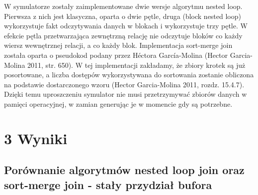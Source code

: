 \documentclass[]{article}
\begin{document}
W symulatorze zostały zaimplementowane dwie wersje algorytmu nested
loop. Pierwsza z nich jest klasyczna, oparta o dwie pętle, druga (block
nested loop) wykorzystuje fakt odczytywania danych w blokach i
wykorzystuje trzy pętle. W efekcie pętla przetwarzająca zewnętrzną
relację nie odczytuje bloków co każdy wiersz wewnętrznej relacji, a co
każdy blok. Implementacja sort-merge join została oparta o pseudokod
podany przez Héctora García-Molina (Hector Garcia-Molina 2011, str.
650). W tej implementacji zakładamy, że zbiory krotek są już
posortowane, a liczba dostępów wykorzystywana do sortowania zostanie
obliczona na podstawie dostarczonego wzoru (Hector Garcia-Molina 2011,
rozdz. 15.4.7). Dzięki temu uproszczeniu symulator nie musi
przetrzymywać zbiorów danych w pamięci operacyjnej, w zamian generując
je w momencie gdy są potrzebne. \vspace{2mm}

\section{3 Wyniki}\label{wyniki}

\subsection{Porównanie algorytmów nested loop join oraz sort-merge join
- stały przydział
bufora}\label{porownanie-algorytmow-nested-loop-join-oraz-sort-merge-join---stay-przydzia-bufora}
\end{document}
